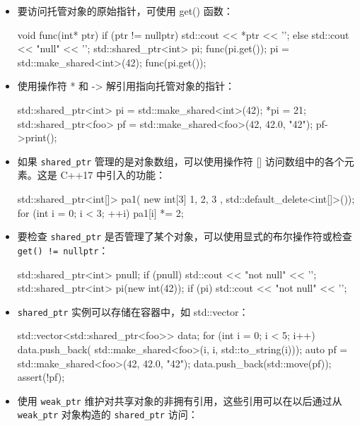 \begin{itemize}
\begin{cpp}
\end{cpp}

\item
要访问托管对象的原始指针，可使用 get() 函数：

\begin{cpp}
void func(int* ptr)
{
    if (ptr != nullptr)
        std::cout << *ptr << '\n';
    else
        std::cout << "null" << '\n';
}
std::shared_ptr<int> pi;
func(pi.get());
pi = std::make_shared<int>(42);
func(pi.get());
\end{cpp}

\item
使用操作符 * 和 -> 解引用指向托管对象的指针：

\begin{cpp}
std::shared_ptr<int> pi = std::make_shared<int>(42);
*pi = 21;
std::shared_ptr<foo> pf = std::make_shared<foo>(42, 42.0, "42");
pf->print();
\end{cpp}

\item
如果 \verb|shared_ptr| 管理的是对象数组，可以使用操作符 [] 访问数组中的各个元素。这是 C++17 中引入的功能：

\begin{cpp}
std::shared_ptr<int[]> pa1(
    new int[3]{ 1, 2, 3 },
        std::default_delete<int[]>());
for (int i = 0; i < 3; ++i)
    pa1[i] *= 2;
\end{cpp}

\item
要检查 \verb|shared_ptr| 是否管理了某个对象，可以使用显式的布尔操作符或检查 \verb|get() != nullptr|：

\begin{cpp}
std::shared_ptr<int> pnull;
if (pnull) std::cout << "not null" << '\n';
std::shared_ptr<int> pi(new int(42));
if (pi) std::cout << "not null" << '\n';
\end{cpp}

\item
\verb|shared_ptr| 实例可以存储在容器中，如 std::vector：

\begin{cpp}
std::vector<std::shared_ptr<foo>> data;
for (int i = 0; i < 5; i++)
    data.push_back(
        std::make_shared<foo>(i, i, std::to_string(i)));
auto pf = std::make_shared<foo>(42, 42.0, "42");
data.push_back(std::move(pf));
assert(!pf);
\end{cpp}

\item
使用 \verb|weak_ptr| 维护对共享对象的非拥有引用，这些引用可以在以后通过从 \verb|weak_ptr| 对象构造的 \verb|shared_ptr| 访问：


\end{itemize}
